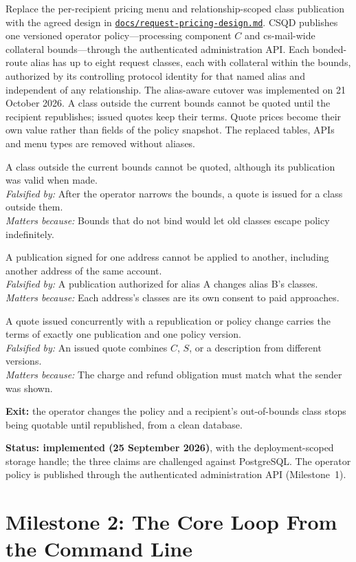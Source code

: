 \documentclass[11pt]{article}
\newenvironment{claims}{\begin{description}[leftmargin=1em,style=nextline,itemsep=0.4em]}{\end{description}}
\newcommand{\claim}[4]{\Needspace{6\baselineskip}\item[Claim (#1).] #2\\
    \textit{Falsified by:} #3\\
    \textit{Matters because:} #4}
\begin{document}
Replace the per-recipient pricing menu and relationship-scoped class publication
with the agreed design in
\href{docs/request-pricing-design.md}{\texttt{docs/request-pricing-design.md}}.
CSQD publishes one versioned operator policy---processing component $C$ and
cs-mail-wide collateral bounds---through the authenticated administration API.
Each bonded-route alias has up to eight request classes, each with collateral
within the bounds, authorized by its controlling protocol identity for that named
alias and independent of any relationship. The alias-aware cutover was
implemented on 21 October 2026. A class outside the current bounds cannot be quoted until the
recipient republishes; issued quotes keep their terms. Quote prices become their
own value rather than fields of the policy snapshot. The replaced tables, APIs and
menu types are removed without aliases.

\begin{claims}
\claim{PostgreSQL}{A class outside the current bounds cannot be quoted, although its publication was valid when made.}
    {After the operator narrows the bounds, a quote is issued for a class outside them.}
    {Bounds that do not bind would let old classes escape policy indefinitely.}
\claim{PostgreSQL}{A publication signed for one address cannot be applied to another, including another address of the same account.}
    {A publication authorized for alias A changes alias B's classes.}
    {Each address's classes are its own consent to paid approaches.}
\claim{PostgreSQL}{A quote issued concurrently with a republication or policy change carries the terms of exactly one publication and one policy version.}
    {An issued quote combines $C$, $S$, or a description from different versions.}
    {The charge and refund obligation must match what the sender was shown.}
\end{claims}

\textbf{Exit:} the operator changes the policy and a recipient's out-of-bounds
class stops being quotable until republished, from a clean database.

\textbf{Status: implemented (25 September 2026)}, with the deployment-scoped storage
handle; the three claims are challenged against PostgreSQL. The operator policy is
published through the authenticated administration API (Milestone~1).

\section{Milestone 2: The Core Loop From the Command Line}
\end{document}
